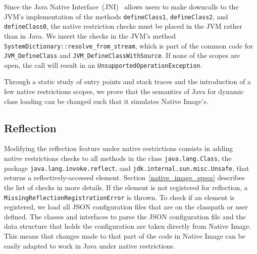 Since the Java Native Interface~(JNI)~\cite{noauthor_jni_nodate} allows users to make downcalls to the JVM's implementation of the methods \verb|defineClass1|, \verb|defineClass2|, and \verb|defineClass0|, the native restriction checks must be placed in the JVM rather than in Java. We insert the checks in the JVM's method \verb|SystemDictionary::resolve_from_stream|, which is part of the common code for \verb|JVM_DefineClass| and \verb|JVM_DefineClassWithSource|. If none of the scopes are open, the call will result in an \verb|UnsupportedOperationException|. 

Through a static study of entry points and stack traces and the introduction of a few native restrictions scopes, we prove that the semantics of Java for dynamic class loading can be changed such that it simulates Native Image's.

\subsection{Reflection}
Modifying the reflection feature under native restrictions consists in adding native restrictions checks to all methods in the class \verb|java.lang.Class|, the package \verb|java.lang.invoke.reflect|, and \verb|jdk.internal.sun.misc.Unsafe|, that returns a reflectively-accessed element. Section~\ref{native_image_specs} describes the list of checks in more details. 
If the element is not registered for reflection, a \verb|MissingReflectionRegistrationError| is thrown.
To check if an element is registered, we load all JSON configuration files that are on the classpath or user defined. The classes and interfaces to parse the JSON configuration file and the data structure that holds the configuration are taken directly from Native Image. This means that changes made to that part of the code in Native Image can be easily adapted to work in Java under native restrictions.

